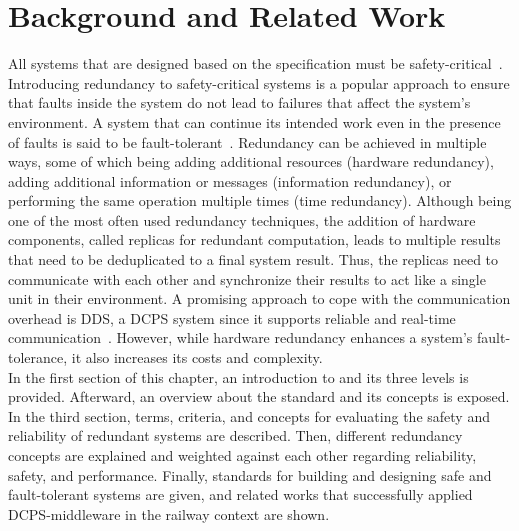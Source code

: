  \chapter{Background and Related Work}
\label{chptr:concepts}

All systems that are designed based on the  specification must be safety-critical~\cite{OnBoardUnitSafetyTesting}. 
Introducing redundancy to safety-critical systems is a popular approach to ensure that faults inside the system do not lead to failures that affect the system's environment.
A system that can continue its intended work even in the presence of faults is said to be fault-tolerant~\cite{BarryFaultToleranceAnalysis}.
Redundancy can be achieved in multiple ways, some of which being adding additional resources (hardware redundancy), adding additional information or messages (information redundancy), or performing the same operation multiple times (time redundancy).
Although being one of the most often used redundancy techniques, the addition of hardware components, called replicas for redundant computation, leads to multiple results that need to be deduplicated to a final system result.
Thus, the replicas need to communicate with each other and synchronize their results to act like a single unit in their environment.
A promising approach to cope with the communication overhead is \gls*{DDS}, a \gls*{DCPS} system since it supports reliable and real-time communication~\cite{omgDDSspec}.
However, while hardware redundancy enhances a system's fault-tolerance, it also increases its costs and complexity.
\\

In the first section of this chapter, an introduction to  and its three levels is provided.
Afterward, an overview about the  standard and its concepts is exposed.
In the third section, terms, criteria, and concepts for evaluating the safety and reliability of redundant systems are described.
Then, different redundancy concepts are explained and weighted against each other regarding reliability, safety, and performance.
Finally, standards for building and designing safe and fault-tolerant systems are given, and related works that successfully applied \gls*{DCPS}-middleware in the railway context are shown.

